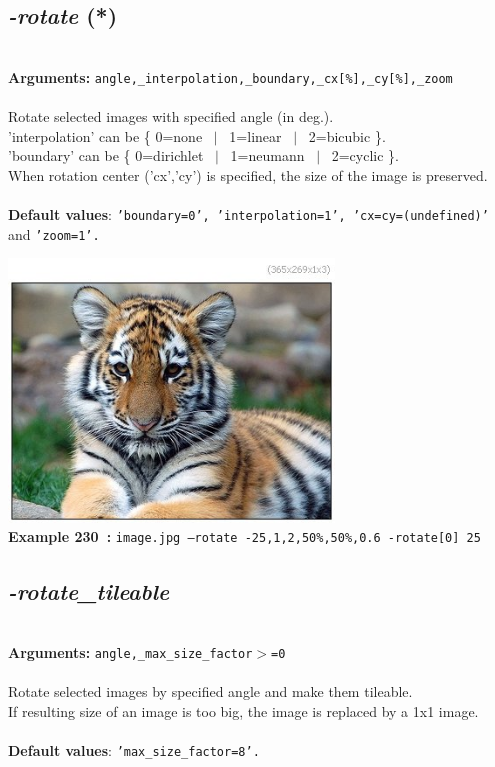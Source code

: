 \documentclass[a4paper,11pt,twoside]{book}
\begin{document}
\subsection{\emph{-rotate} (*)}\vspace*{-0.5em}
~\\\textbf{Arguments: } 
{\small \texttt{angle,\_interpolation,\_boundary,\_cx[\%],\_cy[\%],\_zoom}}\\~\\
Rotate selected images with specified angle (in deg.).
~\\'interpolation' can be \{ 0=none ~$|$~ 1=linear ~$|$~ 2=bicubic \}.
~\\'boundary' can be \{ 0=dirichlet ~$|$~ 1=neumann ~$|$~ 2=cyclic \}.
~\\When rotation center ('cx','cy') is specified, the size of the image is preserved.
~\\~\\\textbf{Default values}: {\small \texttt{'boundary=0', 'interpolation=1', 'cx=cy=(undefined)'} and \texttt{'zoom=1'.}}
\begin{center}\includegraphics[keepaspectratio=true,height=7cm,width=\textwidth]{img/gmic_def230.jpg}\\
{\footnotesize \textbf{Example 230~:} \texttt{image.jpg --rotate -25,1,2,50\%,50\%,0.6 -rotate[0] 25}}
\end{center}

\subsection{\emph{-rotate\_tileable} }\vspace*{-0.5em}
~\\\textbf{Arguments: } 
{\small \texttt{angle,\_max\_size\_factor$>$=0}}\\~\\
Rotate selected images by specified angle and make them tileable.
~\\If resulting size of an image is too big, the image is replaced by a 1x1 image.
~\\~\\\textbf{Default values}: {\small \texttt{'max\_size\_factor=8'.}}
\end{document}
